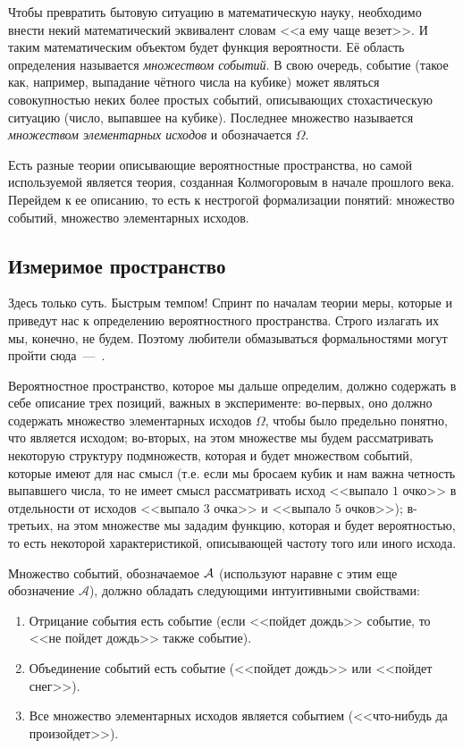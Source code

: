 \documentclass[../TV&MS.tex]{subfiles}
\begin{document}
Чтобы превратить бытовую ситуацию в математическую науку, необходимо 
внести некий математический эквивалент словам <<а ему чаще везет>>.
И таким математическим объектом будет функция вероятности. 
Её область определения называется \emph{множеством событий}. В свою очередь, событие 
(такое как, например, выпадание чётного числа на кубике) может являться совокупностью неких 
более простых событий, описывающих стохастическую ситуацию (число, выпавшее на кубике). 
Последнее множество называется \emph{множеством элементарных исходов} и обозначается $\Omega$.  

Есть разные теории описывающие вероятностные пространства, но самой используемой является 
теория, созданная Колмогоровым в начале прошлого века. Перейдем к ее описанию, то есть
к нестрогой формализации понятий: множество событий, множество элементарных исходов.

\subsection{Измеримое пространство}
	
\qquad Здесь только суть. Быстрым темпом! Спринт по началам теории меры,
которые и приведут нас к определению вероятностного пространства. 
Строго излагать их мы, конечно, не будем. Поэтому любители обмазываться 
формальностями могут пройти сюда~---~\cite{Gusev}.

Вероятностное пространство, которое мы дальше определим, должно 
содержать в себе описание трех позиций, важных в эксперименте: 
во-первых, оно должно содержать множество элементарных исходов $\Omega$,
чтобы было предельно понятно, что является исходом; во-вторых,
на этом множестве мы будем рассматривать некоторую структуру подмножеств,
которая и будет множеством событий, которые имеют для нас смысл (т.е.
если мы бросаем кубик и нам важна четность выпавшего числа, то не имеет
смысл рассматривать исход <<выпало $1$ очко>> в отдельности от исходов 
<<выпало $3$ очка>> и <<выпало $5$ очков>>); в-третьих, на этом множестве мы 
зададим функцию, которая и будет вероятностью, то есть некоторой 
характеристикой, описывающей частоту того или иного исхода.

Множество событий, обозначаемое $\mathcal{A}$ (используют наравне с этим еще обозначение 
$\mathscr{A}$), должно обладать следующими интуитивными свойствами:
\begin{enumerate}
	\item Отрицание события есть событие (если <<пойдет дождь>> событие, 
	то <<не пойдет дождь>> также событие).
	\item Объединение событий есть событие (<<пойдет дождь>> или <<пойдет снег>>).
	\item Все множество элементарных исходов является событием (<<что-нибудь да произойдет>>).
\end{enumerate}
\end{document}
